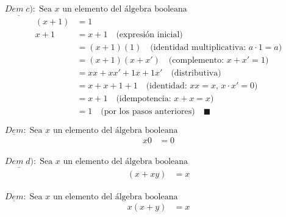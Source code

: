 \begin{multicols}{2}
	\noindent
	$\underline{Dem \;c)}:\; \text{Sea $x$ un elemento del álgebra booleana}$
	\begin{align*}
		(x+1) & = 1                                                            \\
		x+1   & = x+1 \quad \text{(expresión inicial)}                         \\
		      & = (x+1)(1) \quad \text{(identidad multiplicativa: $a·1=a$)}    \\
		      & = (x+1)(x+x') \quad \text{(complemento: $x+x'=1$)}             \\
		      & = xx+x x'+1x+1x' \quad \text{(distributiva)}                   \\
		      & = x+x+1+1 \quad \text{(identidad: $xx=x$, $x·x'=0$)}           \\
		      & = x+1 \quad \text{(idempotencia: $x+x=x$)}                     \\
		      & = 1 \quad \text{(por los pasos anteriores)} \quad \blacksquare
	\end{align*}

	\columnbreak

	\noindent
	$\underline{Dem}:\; \text{Sea $x$ un elemento del álgebra booleana}$
	\begin{align*}
		x0 & = 0 \\
	\end{align*}
\end{multicols}

\begin{multicols}{2}
	\noindent
	$\underline{Dem \;d)}:\; \text{Sea $x$ un elemento del álgebra booleana}$
	\begin{align*}
		(x+xy) & =x \\
	\end{align*}

	\columnbreak

	\noindent
	$\underline{Dem}:\; \text{Sea $x$ un elemento del álgebra booleana}$
	\begin{align*}
		x(x+y) & =x \\
	\end{align*}
\end{multicols}

